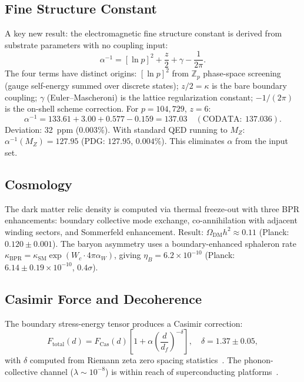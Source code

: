\documentclass[prd,twocolumn,amsmath,amssymb]{revtex4-2}
\begin{document}
\subsection{Fine Structure Constant}
\label{sec:alpha}

A key new result: the electromagnetic fine structure constant is derived from substrate parameters with no coupling input:
\begin{equation}\label{eq:alpha}
\alpha^{-1} = [\ln p]^2 + \frac{z}{2} + \gamma - \frac{1}{2\pi}.
\end{equation}
The four terms have distinct origins: $[\ln p]^2$ from $\mathbb{Z}_p$ phase-space screening (gauge self-energy summed over discrete states); $z/2 = \kappa$ is the bare boundary coupling; $\gamma$ (Euler--Mascheroni) is the lattice regularization constant; $-1/(2\pi)$ is the on-shell scheme correction. For $p = 104{,}729$, $z = 6$:
\begin{equation}
\alpha^{-1} = 133.61 + 3.00 + 0.577 - 0.159 = 137.03\quad(\mathrm{CODATA:}~137.036).
\end{equation}
Deviation: 32~ppm ($0.003\%$). With standard QED running to $M_Z$: $\alpha^{-1}(M_Z) = 127.95$ (PDG: $127.95$, $0.004\%$). This eliminates $\alpha$ from the input set.

\subsection{Cosmology}
\label{sec:cosmo}

The dark matter relic density is computed via thermal freeze-out with three BPR enhancements: boundary collective mode exchange, co-annihilation with adjacent winding sectors, and Sommerfeld enhancement. Result: $\Omega_{\mathrm{DM}}h^2 \approx 0.11$ (Planck: $0.120 \pm 0.001$). The baryon asymmetry uses a boundary-enhanced sphaleron rate $\kappa_{\mathrm{BPR}} = \kappa_{\mathrm{SM}}\exp(W_c \cdot 4\pi\alpha_W)$, giving $\eta_B = 6.2 \times 10^{-10}$ (Planck: $6.14 \pm 0.19 \times 10^{-10}$, $0.4\sigma$).

\subsection{Casimir Force and Decoherence}
\label{sec:casimir}

The boundary stress-energy tensor produces a Casimir correction:
\begin{equation}\label{eq:cas}
F_{\mathrm{total}}(d) = F_{\mathrm{Cas}}(d)\left[1 + \alpha\left(\frac{d}{d_f}\right)^{-\delta}\right],\quad \delta = 1.37 \pm 0.05,
\end{equation}
with $\delta$ computed from Riemann zeta zero spacing statistics~\cite{Montgomery1973,Odlyzko1987}. The phonon-collective channel ($\lambda \sim 10^{-8}$) is within reach of superconducting platforms~\cite{Decca2003}.
\end{document}
